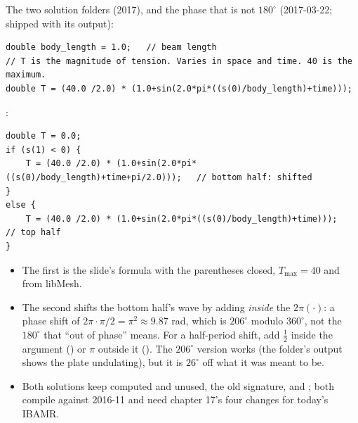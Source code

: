 \documentclass[aspectratio=169,11pt]{beamer}
\begin{document}
\begin{frame}[fragile]{The two solution folders (2017), and the phase that is not $180^\circ$}
\label{fr:homework2}
\scriptsize
{} (2017-03-22; shipped with its output):
\begin{lstlisting}[style=cpptiny]
double body_length = 1.0;	// beam length
// T is the magnitude of tension. Varies in space and time. 40 is the maximum.
double T = (40.0 /2.0) * (1.0+sin(2.0*pi*((s(0)/body_length)+time)));
\end{lstlisting}
:
\begin{lstlisting}[style=cpptiny]
double T = 0.0;
if (s(1) < 0) {
	T = (40.0 /2.0) * (1.0+sin(2.0*pi*((s(0)/body_length)+time+pi/2.0)));   // bottom half: shifted
}
else {
	T = (40.0 /2.0) * (1.0+sin(2.0*pi*((s(0)/body_length)+time)));          // top half
}
\end{lstlisting}
\begin{itemize}
  \item The first is the slide's formula with the parentheses closed, $T_{\max} = 40$ and  from libMesh.
  \item The second shifts the bottom half's wave by adding  \emph{inside} the $2\pi(\cdot)$: a phase shift of $2\pi\cdot\pi/2 = \pi^2 \approx 9.87$ rad, which is $206^\circ$ modulo $360^\circ$, not the $180^\circ$ that ``out of phase'' means. For a half-period shift, add $\tfrac12$ inside the argument () or $\pi$ outside it (). The $206^\circ$ version works (the folder's output shows the plate undulating), but it is $26^\circ$ off what it was meant to be.
  \item Both solutions keep  computed and unused, the old signature, and ; both compile against 2016-11 and need chapter 17's four changes for today's IBAMR.
\end{itemize}
\end{frame}
\end{document}
